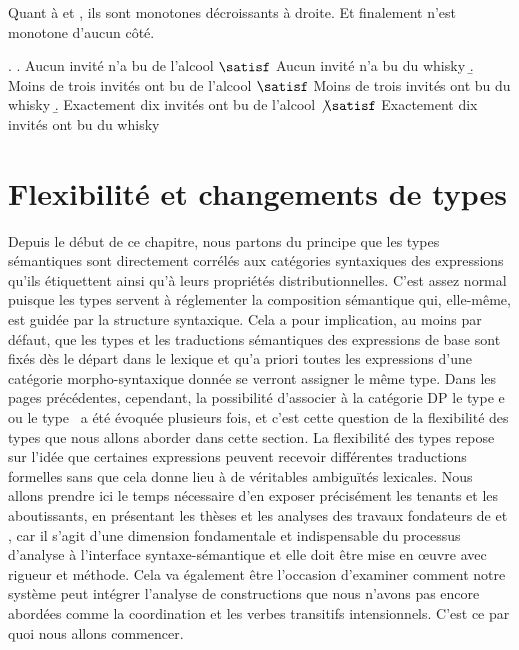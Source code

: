 \newpage

Quant à  et , ils sont monotones décroissants à droite.  Et finalement  n'est monotone d'aucun côté.

\ex.
\a. Aucun invité n'a bu de l'alcool $\satisf$ Aucun invité n'a bu du whisky
\b. Moins de trois invités ont bu de l'alcool $\satisf$ Moins de trois invités ont bu du whisky
\b. Exactement dix invités ont bu de l'alcool $\not\satisf$ Exactement dix invités ont bu du whisky

%




\section{Flexibilité et changements de types}
\label{s:typeshift}

Depuis le début de ce chapitre, nous partons du principe que 
les types sémantiques sont directement corrélés aux catégories syntaxiques des expressions qu'ils étiquettent ainsi qu'à leurs  propriétés distributionnelles. 
C'est assez normal puisque les types servent à réglementer la composition sémantique qui, elle-même, est guidée par la structure syntaxique.
Cela a pour implication, au moins par défaut, que les types et les traductions sémantiques des expressions de base sont fixés dès le départ dans le lexique et qu'a priori toutes les expressions d'une catégorie morpho-syntaxique donnée se verront assigner le même type.  
Dans les pages précédentes, cependant, la possibilité d'associer à la catégorie DP le type \typ e ou le type \ett\ a été évoquée plusieurs fois, et c'est cette question de la flexibilité des types que nous allons aborder dans cette section.
La flexibilité des types repose sur l'idée que certaines expressions peuvent recevoir différentes traductions formelles sans que cela donne lieu à de véritables ambiguïtés lexicales.
Nous allons prendre ici le temps nécessaire d'en exposer précisément les tenants et les aboutissants, en présentant les thèses et les analyses des travaux fondateurs de  
\citet{PartRooth:83} et \citet{Partee:87}, car il s'agit d'une dimension fondamentale et indispensable du processus d'analyse à l'interface syntaxe-sémantique et elle doit être mise en \oe uvre avec rigueur et méthode.  Cela va également être l'occasion d'examiner comment notre système peut intégrer l'analyse de constructions que nous n'avons pas encore abordées comme la coordination et les verbes transitifs intensionnels.  C'est ce par quoi nous allons commencer.




